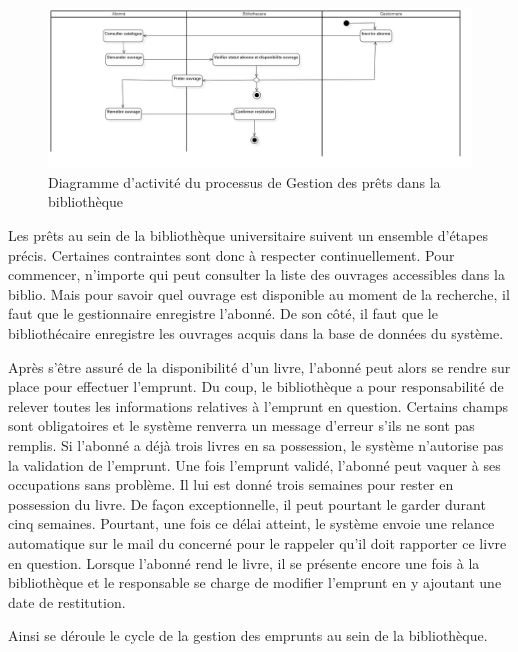 \paragraph{}
\begin{figure}[h]
        \centering
        \includegraphics[width=1\textwidth]{ActivityDiagram1}
        \caption{Diagramme d’activité du processus de Gestion des prêts dans la bibliothèque}
        \label{image-ActivityDiagram1}
        \end{figure}
\par
Les prêts au sein de la bibliothèque universitaire suivent un ensemble d'étapes précis.
Certaines contraintes sont donc à respecter continuellement. Pour commencer, n'importe qui 
peut consulter la liste des ouvrages accessibles dans la biblio. Mais pour savoir quel 
ouvrage est disponible au moment de la recherche, il faut que le gestionnaire enregistre 
l'abonné. De son côté, il faut que le bibliothécaire enregistre les ouvrages acquis 
dans la base de données du système. \par 
Après s'être assuré de la disponibilité d'un livre, l'abonné peut alors se rendre sur 
place pour effectuer l'emprunt. Du coup, le bibliothèque a pour responsabilité de relever
toutes les informations relatives à l'emprunt en question. Certains champs sont obligatoires
et le système renverra un message d'erreur s'ils ne sont pas remplis. Si l'abonné a déjà 
trois livres en sa possession, le système n'autorise pas la validation de l'emprunt.
Une fois l'emprunt validé, l'abonné peut vaquer à ses occupations sans problème. Il lui 
est donné trois semaines pour rester en possession du livre. De façon exceptionnelle, il 
peut pourtant le garder durant cinq semaines. Pourtant, une fois ce délai atteint, le 
système envoie une relance automatique sur le mail du concerné pour le rappeler qu'il doit 
rapporter ce livre en question.
Lorsque l'abonné rend le livre, il se présente encore une fois à la bibliothèque et le 
responsable se charge de modifier l'emprunt en y ajoutant une date de restitution. \par 
Ainsi se déroule le cycle de la gestion des emprunts au sein de la bibliothèque.

